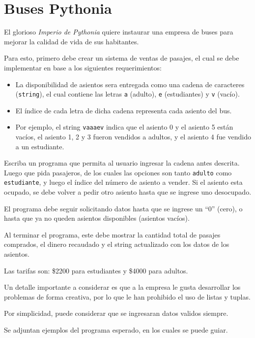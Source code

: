 \section{Buses Pythonia}

El glorioso \textit{Imperio de Pythonia} quiere instaurar una empresa de buses para mejorar la calidad de vida de sus habitantes.

Para esto, primero debe crear un sistema de ventas de pasajes, el cual se debe implementar en base a los siguientes requerimientos:

\begin{itemize}
    \item La disponibilidad de asientos sera entregada como una cadena de caracteres (\texttt{string}), el cual contiene las letras \texttt{a} (adulto), \texttt{e} (estudiantes) y \texttt{v} (vacío).

    \item El índice de cada letra de dicha cadena representa cada asiento del bus.
    
    \item Por ejemplo, el string \texttt{vaaaev} indica que el asiento 0 y el asiento 5 están vacíos, el asiento 1, 2 y 3 fueron vendidos a adultos, y el asiento 4 fue vendido a un estudiante.
\end{itemize}

Escriba un programa que permita al usuario ingresar la cadena antes descrita. Luego que pida pasajeros, de los cuales las opciones son tanto \texttt{adulto} como \texttt{estudiante}, y luego el índice del número de asiento a vender. Si el asiento esta ocupado, se debe volver a pedir otro asiento hasta que se ingrese uno desocupado.

El programa debe seguir solicitando datos hasta que se ingrese un ``0'' (cero), o hasta que ya no queden asientos disponibles (asientos vacíos).

Al terminar el programa, este debe mostrar la cantidad total de pasajes comprados, el dinero recaudado y el string actualizado con los datos de los asientos.

Las tarifas son: \$2200 para estudiantes y \$4000 para adultos.

Un detalle importante a considerar es que a la empresa le gusta desarrollar los problemas de forma creativa, por lo que le han prohibido el uso de listas y tuplas.

Por simplicidad, puede considerar que se ingresaran datos validos siempre.

Se adjuntan ejemplos del programa esperado, en los cuales se puede guiar.

